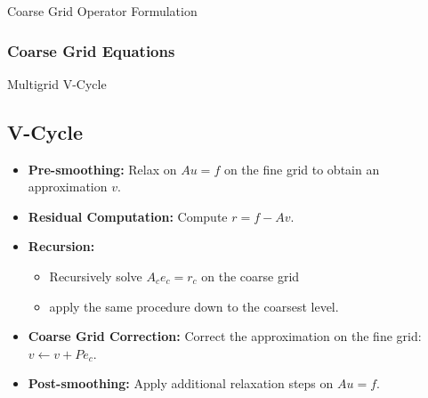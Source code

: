 \documentclass{beamer}
\begin{document}
\begin{frame}{Coarse Grid Operator Formulation}
\subsubsection*{Coarse Grid Equations}

\begin{itemize}
    \end{itemize}
\end{frame}

\begin{frame}{Multigrid V-Cycle}
\subsection*{V-Cycle}

\begin{itemize}
    \item \textbf{Pre-smoothing:} Relax on $Au = f$ on the fine grid to obtain an approximation $v$.
    \item \textbf{Residual Computation:} Compute $r = f - Av$.
    \item \textbf{Recursion:}
    \begin{itemize}
        \item Recursively solve $A_{c}e_{c} = r_{c}$ on the coarse grid
        \item apply the same procedure down to the coarsest level.
    \end{itemize}
    \item \textbf{Coarse Grid Correction:} Correct the approximation on the fine grid: $v \leftarrow v + Pe_{c}$.
    \item \textbf{Post-smoothing:} Apply additional relaxation steps on $Au = f$.
\end{itemize}
\end{frame}
\end{document}
